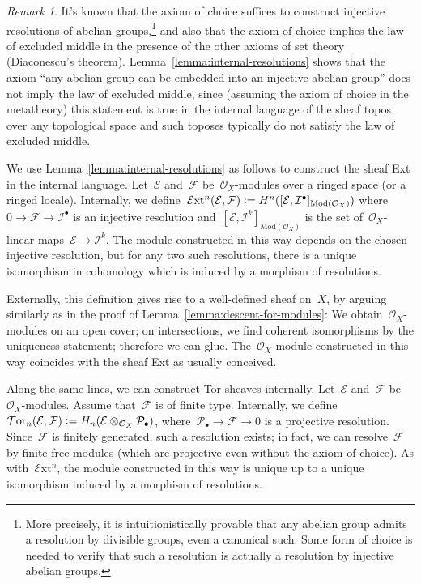 \documentclass[10pt,reqno,a4paper]{amsbook}
\theoremstyle{definition}
\theoremstyle{plain}
\theoremstyle{remark}
\newtheorem{rem}[defn]{Remark}
\newcommand{\E}{\mathcal{E}}
\newcommand{\F}{\mathcal{F}}
\renewcommand{\O}{\mathcal{O}}
\renewcommand{\P}{\mathcal{P}}
\newcommand{\I}{\mathcal{I}}
\newcommand{\EXT}{\mathcal{E}\mathrm{xt}}
\newcommand{\TOR}{\mathcal{T}\mathrm{or}}
\newcommand{\Mod}{\mathrm{Mod}}
\newcommand{\?}{\,{:}\,}
\renewcommand{\_}{\mathpunct{.}\,}
\newcommand{\defeq}{\vcentcolon=}
\begin{document}
\begin{rem}It's known that the axiom of choice suffices to construct injective
resolutions of abelian groups,\footnote{More precisely, it is intuitionistically
provable that any abelian group admits a resolution by divisible groups, even a
canonical such. Some form of choice is needed to verify that such a resolution
is actually a resolution by injective abelian groups.}
and also that the axiom of choice implies the law of excluded middle in the
presence of the other axioms of set theory (Diaconescu's theorem).
Lemma~\ref{lemma:internal-resolutions} shows that the axiom ``any abelian group
can be embedded into an injective abelian group'' does not imply the law of
excluded middle, since (assuming the axiom of choice in the metatheory) this
statement is true in the internal language of the sheaf topos over any
topological space and such toposes typically do not satisfy the law of excluded
middle.
\end{rem}

We use Lemma~\ref{lemma:internal-resolutions} as follows to construct the sheaf
Ext in the internal language. Let~$\E$ and~$\F$ be~$\O_X$-modules over a ringed
space (or a ringed locale). Internally, we define~$\EXT^n(\E,\F) \defeq
H^n([\E,\I^\bullet]_{\Mod(\O_X)})$ where~$0 \to \F \to \I^\bullet$ is an
injective resolution and~$[\E,\I^k]_{\Mod(\O_X)}$ is the set of~$\O_X$-linear
maps~$\E \to \I^k$. The module constructed in this way depends on the chosen
injective resolution, but for any two such resolutions, there is a unique
isomorphism in cohomology which is induced by a morphism of resolutions.

Externally, this definition gives rise to a well-defined sheaf on~$X$, by
arguing similarly as in the proof of Lemma~\ref{lemma:descent-for-modules}: We
obtain~$\O_X$-modules on an open cover; on intersections, we find coherent
isomorphisms by the uniqueness statement; therefore we can glue.
The~$\O_X$-module constructed in this way coincides with the sheaf Ext as
usually conceived.

Along the same lines, we can construct Tor sheaves internally. Let~$\E$
and~$\F$ be~$\O_X$-modules. Assume that~$\F$ is of finite type. Internally, we
define~$\TOR_n(\E,\F) \defeq H_n(\E \otimes_{\O_X} \P_\bullet)$,
where~$\P_\bullet \to \F \to 0$ is a projective resolution. Since~$\F$ is
finitely generated, such a resolution exists; in fact, we can resolve~$\F$ by
finite free modules (which are projective even without the axiom of choice). As
with~$\EXT^n$, the module constructed in this way is unique up to a unique
isomorphism induced by a morphism of resolutions.
\end{document}
